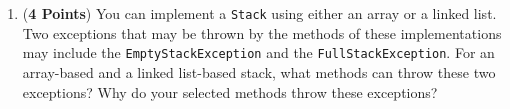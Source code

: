 \documentclass[12pt]{article}
\begin{document}
\begin{enumerate}
\begin{enumerate}
          \item ({\bf 4 Points}) You can implement a {\tt Stack} using either an array or a linked list. Two exceptions
            that may be thrown by the methods of these implementations may include the {\tt EmptyStackException} and
            the {\tt FullStackException}.  For an array-based and a linked list-based stack, what methods can throw
            these two exceptions?  Why do your selected methods throw these exceptions?
            


        \end{enumerate}

        \newpage







\end{enumerate}
\end{document}
